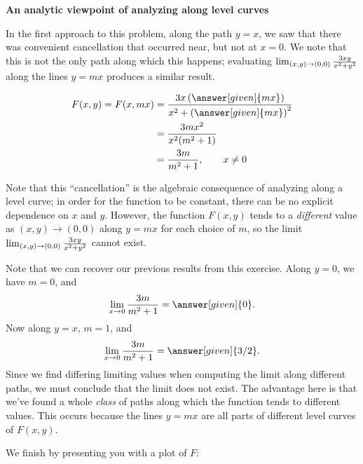 \documentclass{ximera}
\begin{document}
\textbf{An analytic viewpoint of analyzing along level curves}
\begin{explanation}
In the first approach to this problem, along the path $y=x$, we saw that there was convenient cancellation that occurred near, but not at $x=0$.  We note that this is not the only path along which this happens; evaluating $\lim_{\left(x,y\right)\to\left(0,0\right)} \frac{3xy}{x^2+y^2}$ along the lines $y=mx$ produces a similar result.

    \begin{align*}
    F(x,y) = F(x,mx) &= \frac{3x\left(\answer[given]{m x}\right)}{x^2+\left(\answer[given]{mx}\right)^2}  \\
    &= \frac{3mx^2}{x^2(m^2+1)}\\
      &= \frac{3m}{m^2+1}, \qquad x \neq 0\\
    \end{align*}

    Note that this ``cancellation'' is the algebraic consequence of analyzing along a level curve; in order for the function to be constant, there can be no explicit dependence on $x$ and $y$.   However, the function $F(x,y)$ tends to a \textit{different} value as $(x,y) \to (0,0)$ along $y=mx$ for each choice of $m$, so the limit $\lim_{\left(x,y\right)\to\left(0,0\right)} \frac{3xy}{x^2+y^2}$ cannot exist.

 \begin{remark}
    Note that we can recover our previous results from this exercise.  Along $y=0$, we have $m=0$, and
       \[
    \lim_{x\to 0}\frac{3m}{m^2+1} = \answer[given]{0}.
    \]
    Now along $y=x$, $m=1$, and
    \[
    \lim_{x\to 0}\frac{3m}{m^2+1} = \answer[given]{3/2}.
    \]
    Since we find differing limiting values when computing the limit
    along different paths, we must conclude that the limit does not
    exist.  The advantage here is that we've found a whole \emph{class} of paths along which the function tends to different values.  This occurs because the lines $y=mx$ are all parts of different level curves of $F(x,y)$.
    \end{remark}

    \begin{onlineOnly}
      We finish by presenting you with a plot of $F$:
      \begin{center}
      \end{center}
    \end{onlineOnly}

  \end{explanation}
\end{document}
